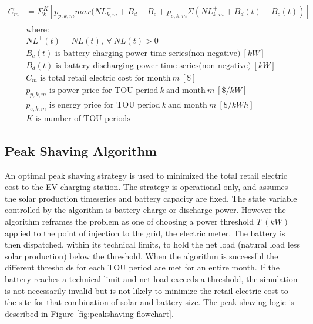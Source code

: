 \documentclass[journal,article,submit,pdftex,moreauthors]{Definitions/mdpi}
\begin{document}
\begin{equation}
  \label{eq:cost}
  \begin{split}
    C_m &= \Sigma_k^K [ p_{p,k,m} max(NL^+_{k,m} + B_d - B_c + p_{e,k,m} \Sigma (NL^+_{k,m} + B_d(t) - B_c(t)) ] \\
    \\
    & \text{where:} \\
    & NL^+(t) = NL(t),\ \forall\ NL(t)>0\\
    &B_c(t) \text{ is battery charging power time series(non-negative)}\ [kW]\\
    &B_d(t) \text{ is battery discharging power time series(non-negative)}\ [kW] \\
    &C_m \text{ is total retail electric cost for month}\ m\ [\$] \\
    &p_{p,k,m} \text{ is power price for TOU period}\ k\ \text{and month}\ m\  [\$/kW] \\
    &p_{e,k,m} \text{ is energy price for TOU period}\ k\ \text{and month}\ m\ [\$/kWh] \\
    &K \text{ is number of TOU periods}
  \end{split}
\end{equation}

\subsection{Peak Shaving Algorithm}\label{peak-shaving-algorithm}%

An optimal peak shaving strategy is used to minimized the total retail
electric cost to the EV charging station. The strategy is operational
only, and assumes the solar production timeseries and battery capacity
are fixed. The state variable controlled by the algorithm is battery
charge or discharge power. However the algorithm reframes the problem as
one of choosing a power threshold \(T\ (kW)\) applied to the point of
injection to the grid, the electric meter. The battery is then
dispatched, within its technical limits, to hold the net load (natural
load less solar production) below the threshold. When the algorithm is
successful the different thresholds for each TOU period are met for an
entire month. If the battery reaches a technical limit and net load
exceeds a threshold, the simulation is not necessarily invalid but is
not likely to minimize the retail electric cost to the site for that
combination of solar and battery size. The peak shaving logic is
described in Figure \ref{fig:peakshaving-flowchart}.
\end{document}
